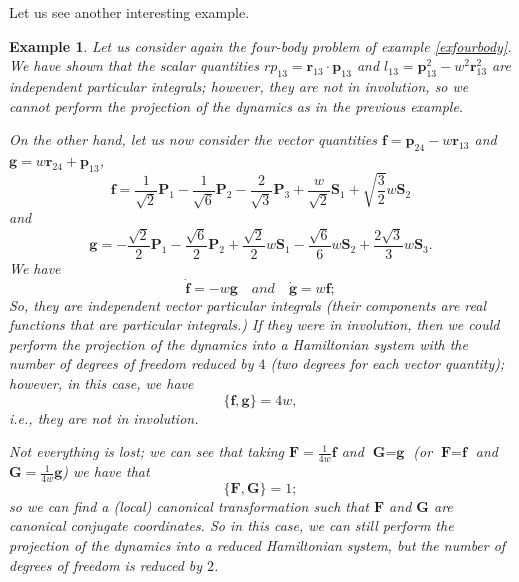 \documentclass[10pt,a4paper]{article}
\newtheorem{example}{Example}
\begin{document}
Let us see another interesting example. 

\begin{example}
Let us consider again the four-body problem of example \ref{exfourbody}. We have shown that the scalar quantities $rp_{13}=\textbf{r}_{13}\cdot \textbf{p}_{13}$ and $l_{13}=\textbf{p}_ {13}^{2}-w^{2}\textbf{r}_{13}^{2}$ are independent particular integrals; however, they are not in involution, so we cannot perform the projection of the dynamics as in the previous example. 

On the other hand, let us now consider the vector quantities $\textbf{f}=\textbf{p}_{24}-w\textbf{r}_{13}$ and $\textbf{g}=w\textbf{r}_{24}+\textbf{p}_{13}$,
\begin{equation*}
\textbf{f}=\frac{1}{\sqrt{2}}\textbf{P}_{1}-\frac{1}{\sqrt{6}}\textbf{P}_{2}-\frac{2}{\sqrt{3}}\textbf{P}_{3}+\frac{w}{\sqrt{2}}\textbf{S}_{1}+\sqrt{\frac{3}{2}}w\textbf{S}_{2}
\end{equation*}
and
\begin{equation*}
\textbf{g}=-\frac{\sqrt{2}}{2}\textbf{P}_{1}-\frac{\sqrt{6}}{2}\textbf{P}_{2}+\frac{\sqrt{2}}{2}w\textbf{S}_{1}-\frac{\sqrt{6}}{6}w\textbf{S}_{2}+\frac{2\sqrt{3}}{3}w\textbf{S}_{3}.
\end{equation*}
We have
\begin{equation*}
\dot{\textbf{f}}=-w\textbf{g}\quad\textit{and}\quad\dot{\textbf{g}}=w\textbf{f};
\end{equation*}
So, they are independent vector particular integrals (their components are real functions that are particular integrals.) If they were in involution, then we could perform the projection of the dynamics into a Hamiltonian system with the number of degrees of freedom reduced by $4$ (two degrees for each vector quantity); however, in this case, we have
\begin{equation*}
\lbrace \textbf{f},\textbf{g}\rbrace=4w,
\end{equation*}
i.e., they are not in involution.

Not everything is lost; we can see that taking $\textbf{F}=\frac{1}{4w}\textbf{f}$ and $\textbf{G}=\textbf{g}$ (or $\textbf{F}=\textbf{f}$ and $\textbf{G}=\frac{1}{4w}\textbf{g}$) we have that 
\begin{equation*}
\lbrace\textbf{F},\textbf{G}\rbrace=1;
\end{equation*}
so we can find a (local) canonical transformation such that $\textbf{F}$ and $\textbf{G}$ are canonical conjugate coordinates. So in this case, we can still perform the projection of the dynamics into a reduced Hamiltonian system, but the number of degrees of freedom is reduced by $2$. 
\end{example}
\end{document}
